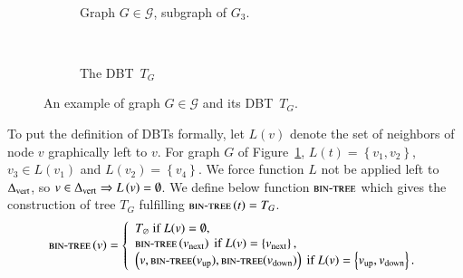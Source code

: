 \documentclass[preprint]{elsarticle}
\newcommand{\set}[1]{\left\{ #1 \right\}}
\newcommand{\mcalg}{\mathcal{G}}
\newcommand{\deltavert}{\Delta_{\mbox{\scriptsize{vert}}}}
\newcommand{\bintree}{\textsc{bin-tree}}
\newcommand{\ebt}{DBT}
\newcommand{\dfs}{L}
\begin{document}
\begin{figure}[h]
\centering
~
\begin{subfigure}[b]{0.46\columnwidth}
\centering
\scalebox{.42}{}
\caption{Graph $G \in \mcalg$, subgraph of $G_3$.}
\label{subfig:ebt_2}
\end{subfigure}
~
\begin{subfigure}[b]{0.46\columnwidth}
\centering
\scalebox{.58}{}
\caption{The \ebt ~$T_G$}
\label{subfig:ebt_3}
\end{subfigure}
\caption{An example of graph $G \in \mcalg$ and its \ebt ~$T_G$.}
\label{fig:ebt}
\end{figure}

To put the definition of \ebt s formally, let $\dfs\left(v\right)$ denote the set of neighbors of node $v$ graphically left to $v$. For graph $G$ of Figure~\ref{subfig:ebt_2}, $\dfs\left(t\right) = \set{v_1,v_2}$, $v_3 \in \dfs\left(v_1\right)$ and $\dfs\left(v_2\right) = \set{v_4}$. We force function $\dfs$ not be applied left to $\deltavert$, so $v \in \deltavert \Rightarrow \dfs\left(v\right) = \emptyset$. We define below function $\bintree$ which gives the construction of tree $T_G$ fulfilling $\bintree \left(t\right) = T_G$.
\[
\bintree\left(v\right) = 
\left\{
\begin{array}{l}
T_\varnothing ~\mbox{if}~ \dfs(v) = \emptyset,\\
\bintree\left(v_{\mbox{\scriptsize{next}}}\right)  ~\mbox{if}~ \dfs(v) = \set{v_{\mbox{\scriptsize{next}}}},\\
\left(v, \bintree(v_{\mbox{\scriptsize{up}}}), \bintree( v_{\mbox{\scriptsize{down}}})\right) ~\mbox{if}~ \dfs(v) = \set{v_{\mbox{\scriptsize{up}}},v_{\mbox{\scriptsize{down}}}}.
\end{array}
\right.
\]
\end{document}
